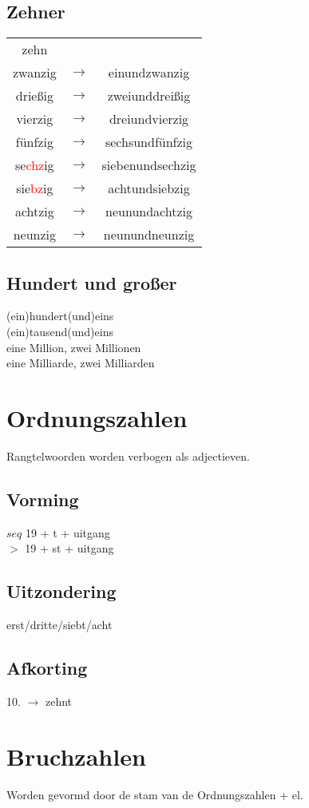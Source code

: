 \documentclass[main.tex]{subfiles}
\begin{document}
\begin{minipage}{0,5\textwidth}
\subsection{Zehner}
\begin{tabular}{ccc}
zehn &  &  \\ 
zwanzig & $\rightarrow$ & einundzwanzig \\ 
drießig & $\rightarrow$ & zweiunddreißig \\ 
vierzig & $\rightarrow$ & dreiundvierzig \\ 
fünfzig & $\rightarrow$ & sechsundfünfzig \\ 
se\textcolor{red}{chz}ig & $\rightarrow$ & siebenundsechzig \\ 
sie\textcolor{red}{bz}ig & $\rightarrow$ & achtundsiebzig \\ 
achtzig & $\rightarrow$ & neunundachtzig \\ 

neunzig & $\rightarrow$ & neunundneunzig \\ 

\end{tabular} 
\end{minipage}
\subsection{Hundert und großer}
(ein)hundert(und)eins\\
(ein)tausend(und)eins\\
eine Million, zwei Millionen\\
eine Milliarde, zwei Milliarden
\section{Ordnungszahlen}
Rangtelwoorden worden verbogen als adjectieven.
\subsection{Vorming}
$seq$ 19 + t + uitgang\\
$>$ 19 + st + uitgang\\
\subsection{Uitzondering}
erst/dritte/siebt/acht
\subsection{Afkorting}
10. $\rightarrow$ zehnt

\section{Bruchzahlen}
Worden gevormd door de stam van de Ordnungszahlen + el.
\end{document}
